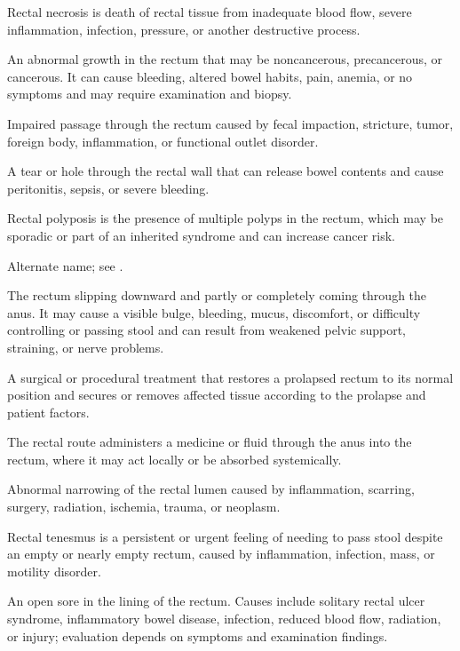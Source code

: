 Rectal necrosis is death of rectal tissue from inadequate blood flow, severe inflammation, infection, pressure, or another destructive process.

 An abnormal growth in the rectum that may be noncancerous, precancerous, or cancerous. It can cause bleeding, altered bowel habits, pain, anemia, or no symptoms and may require examination and biopsy.

 Impaired passage through the rectum caused by fecal impaction, stricture, tumor, foreign body, inflammation, or functional outlet disorder.

 A tear or hole through the rectal wall that can release bowel contents and cause peritonitis, sepsis, or severe bleeding.

 Rectal polyposis is the presence of multiple polyps in the rectum, which may be sporadic or part of an inherited syndrome and can increase cancer risk.

 Alternate name; see .

 The rectum slipping downward and partly or completely coming through the anus. It may cause a visible bulge, bleeding, mucus, discomfort, or difficulty controlling or passing stool and can result from weakened pelvic support, straining, or nerve problems.

 A surgical or procedural treatment that restores a prolapsed rectum to its normal position and secures or removes affected tissue according to the prolapse and patient factors.

 The rectal route administers a medicine or fluid through the anus into the rectum, where it may act locally or be absorbed systemically.

 Abnormal narrowing of the rectal lumen caused by inflammation, scarring, surgery, radiation, ischemia, trauma, or neoplasm.

 Rectal tenesmus is a persistent or urgent feeling of needing to pass stool despite an empty or nearly empty rectum, caused by inflammation, infection, mass, or motility disorder.

 An open sore in the lining of the rectum. Causes include solitary rectal ulcer syndrome, inflammatory bowel disease, infection, reduced blood flow, radiation, or injury; evaluation depends on symptoms and examination findings.

